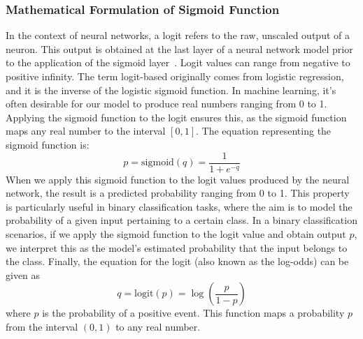 \documentclass[review,1p,times,numbers]{elsarticle}
\begin{document}
\subsubsection{Mathematical Formulation of Sigmoid Function}
In the context of neural networks, a logit refers to the raw, unscaled output of a neuron. This output is obtained at the last layer of a neural network model prior to the application of the sigmoid layer~\cite{furnieles_Sigmoid_2022}. Logit values can range from negative to positive infinity. The term logit-based originally comes from logistic regression, and it is the inverse of the logistic sigmoid function. In machine learning, it's often desirable for our model to produce real numbers ranging from 0 to 1. Applying the sigmoid function to the logit ensures this, as the sigmoid function maps any real number to the interval \([0,1]\).
The equation representing the sigmoid function is:
\begin{equation}
    p = \text{{sigmoid}}(q) = \frac{1}{1 + e^{-q}}
\end{equation}
When we apply this sigmoid function to the logit values produced by the neural network, the result is a predicted probability ranging from 0 to 1. This property is particularly useful in binary classification tasks, where the aim is to model the probability of a given input pertaining to a certain class.
In a binary classification scenarios, if we apply the sigmoid function to the logit value and obtain output \( p \), we interpret this as the model's estimated probability that the input belongs to the class.
Finally, the equation for the logit (also known as the log-odds) can be given as
\begin{equation}
    q = \text{{logit}}(p) = \log \left( \frac{p}{1 - p} \right)
\end{equation}
where \( p \) is the probability of a positive event. This function maps a probability \( p \) from the interval \((0,1)\) to any real number.
\end{document}
